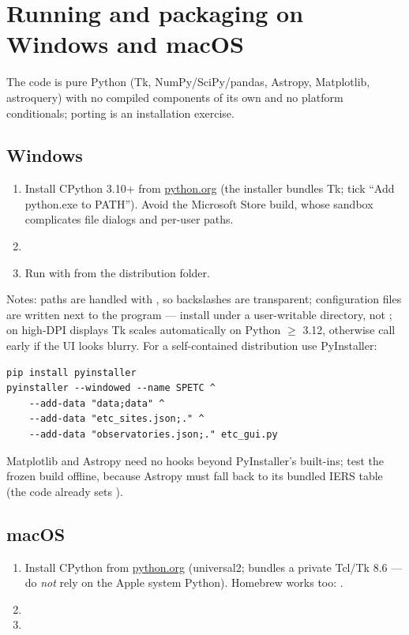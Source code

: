 \section{Running and packaging on Windows and macOS}

The code is pure Python (Tk, NumPy/SciPy/pandas, Astropy, Matplotlib,
astroquery) with no compiled components of its own and no platform
conditionals; porting is an installation exercise.

\subsection{Windows}

\begin{enumerate}
  \item Install CPython 3.10+ from \url{python.org} (the installer bundles
        Tk; tick ``Add python.exe to PATH''). Avoid the Microsoft Store
        build, whose sandbox complicates file dialogs and per-user paths.
  \item {}
  \item Run with  from the distribution folder.
\end{enumerate}

Notes: paths are handled with , so backslashes are transparent;
configuration files are written next to the program --- install under a
user-writable directory, not ; on high-DPI displays Tk
scales automatically on Python $\geq$ 3.12, otherwise call
 early if the UI looks
blurry. For a self-contained distribution use PyInstaller:

\begin{verbatim}
pip install pyinstaller
pyinstaller --windowed --name SPETC ^
    --add-data "data;data" ^
    --add-data "etc_sites.json;." ^
    --add-data "observatories.json;." etc_gui.py
\end{verbatim}

Matplotlib and Astropy need no hooks beyond PyInstaller's built-ins; test
the frozen build offline, because Astropy must fall back to its bundled
IERS table (the code already sets ).

\subsection{macOS}

\begin{enumerate}
  \item Install CPython from \url{python.org} (universal2; bundles a
        private Tcl/Tk 8.6 --- do \emph{not} rely on the Apple system
        Python). Homebrew works too: .
  \item {}
  \item {}
\end{enumerate}

